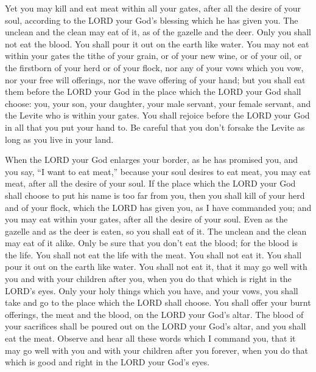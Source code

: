  Yet you may kill and eat meat within all your gates,
after all the desire of your soul, according to the LORD your God's
blessing which he has given you. The unclean and the clean may eat of
it, as of the gazelle and the deer.  Only you shall not
eat the blood. You shall pour it out on the earth like water.
 You may not eat within your gates the tithe of your
grain, or of your new wine, or of your oil, or the firstborn of your
herd or of your flock, nor any of your vows which you vow, nor your free
will offerings, nor the wave offering of your hand;  but
you shall eat them before the LORD your God in the place which the LORD
your God shall choose: you, your son, your daughter, your male servant,
your female servant, and the Levite who is within your gates. You shall
rejoice before the LORD your God in all that you put your hand to.
 Be careful that you don't forsake the Levite as long as
you live in your land.

 When the LORD your God enlarges your border, as he has
promised you, and you say, ``I want to eat meat,'' because your soul
desires to eat meat, you may eat meat, after all the desire of your
soul.  If the place which the LORD your God shall choose
to put his name is too far from you, then you shall kill of your herd
and of your flock, which the LORD has given you, as I have commanded
you; and you may eat within your gates, after all the desire of your
soul.  Even as the gazelle and as the deer is eaten, so
you shall eat of it. The unclean and the clean may eat of it alike.
 Only be sure that you don't eat the blood; for the blood
is the life. You shall not eat the life with the meat. 
You shall not eat it. You shall pour it out on the earth like water.
 You shall not eat it, that it may go well with you and
with your children after you, when you do that which is right in the
LORD's eyes.  Only your holy things which you have, and
your vows, you shall take and go to the place which the LORD shall
choose.  You shall offer your burnt offerings, the meat
and the blood, on the LORD your God's altar. The blood of your
sacrifices shall be poured out on the LORD your God's altar, and you
shall eat the meat.  Observe and hear all these words
which I command you, that it may go well with you and with your children
after you forever, when you do that which is good and right in the LORD
your God's eyes.

